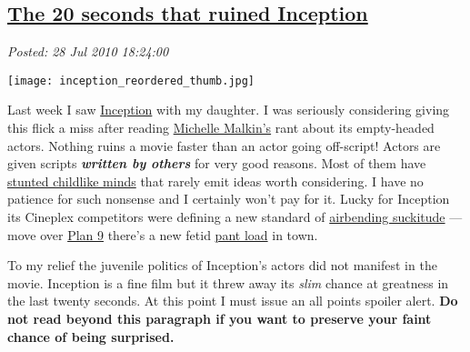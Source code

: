 %

\subsection*{\href{https://bakerjd99.wordpress.com/2010/07/28/the-20-seconds-that-ruined-inception/}{The 20 seconds that ruined Inception}}


\noindent\emph{Posted: 28 Jul 2010 18:24:00}
\vspace{6pt}


\captionsetup[floatingfigure]{labelformat=empty}
\begin{floatingfigure}[l]{0.21\textwidth}
\centering
\texttt{[image: inception\_reordered\_thumb.jpg]}
\label{fig:696X0}
\end{floatingfigure}Last week I saw
\href{http://www.rottentomatoes.com/m/inception/}{Inception} with my
daughter. I was seriously considering giving this flick a miss after
reading
\href{http://michellemalkin.com/2010/07/17/if-you-miss-just-one-movie-this-year-make-it-inception/}{Michelle
Malkin's} rant about its empty-headed actors. Nothing ruins a movie
faster than an actor going off-script! Actors are given scripts
\textbf{\emph{written by others}} for very good reasons. Most of them
have
\href{http://www.huffingtonpost.com/jim-carrey/the-judgment-on-vaccines\_b\_189777.html}{stunted
childlike minds} that rarely emit ideas worth considering. I have no
patience for such nonsense and I certainly won't pay for it. Lucky for
Inception its Cineplex competitors were defining a new standard of
\href{http://www.rottentomatoes.com/m/last\_airbender/}{airbending
suckitude} --- move over
\href{http://en.wikipedia.org/wiki/Plan\_9\_from\_Outer\_Space}{Plan 9}
there's a new fetid
\href{http://www.doubletongued.org/index.php/dictionary/pant\_load/}{pant
load} in town.


To my relief the juvenile politics of Inception's actors did not
manifest in the movie. Inception is a fine film but it threw away its
\emph{slim} chance at greatness in the last twenty seconds. At this
point I must issue an all points spoiler alert. \textbf{Do not read
beyond this paragraph if you want to preserve your faint chance of being
surprised.}

